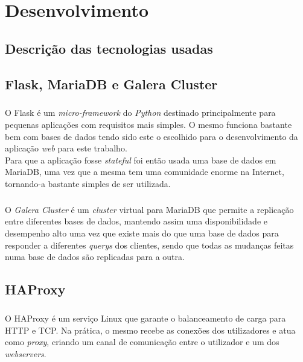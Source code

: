 \documentclass{report}
\begin{document}
\paragraph{}


\chapter{Desenvolvimento}\label{Uma label qualquer}

\section{Descrição das tecnologias usadas}

\section{Flask, MariaDB e Galera Cluster}
\paragraph{}
O Flask é um \emph{micro-framework} do \emph{Python} destinado principalmente para pequenas aplicações com requisitos mais simples. O mesmo funciona bastante bem com bases de dados tendo sido este o escolhido para o desenvolvimento da aplicação \emph{web} para este trabalho.\\
Para que a aplicação fosse \emph{stateful} foi então usada uma base de dados em MariaDB, uma vez que a mesma tem uma comunidade enorme na Internet, tornando-a bastante simples de ser utilizada.

\paragraph{}
O \emph{Galera Cluster} é um \emph{cluster} virtual para MariaDB que permite a replicação entre diferentes bases de dados, mantendo assim uma disponibilidade e desempenho alto uma vez que existe mais do que uma base de dados para responder a diferentes \emph{querys} dos clientes, sendo que todas as mudanças feitas numa base de dados são replicadas para a outra.


\section{HAProxy}
\paragraph{}
O HAProxy é um serviço Linux que garante o balanceamento de carga para HTTP e TCP. Na prática, o mesmo recebe as conexões dos utilizadores e atua como \emph{proxy}, criando um canal de comunicação entre o utilizador e um dos \emph{webservers}.
\end{document}
